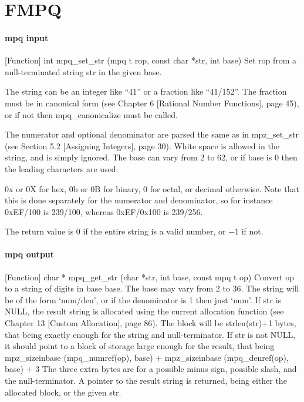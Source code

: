 \chapter{FMPQ}
\lipsum[1]



\subsubsection{mpq input}
[Function] int mpq\_set\_str (mpq t rop, const char *str, int base)
Set rop from a null-terminated string str in the given base.

The string can be an integer like “41” or a fraction like “41/152”. The fraction must be
in canonical form (see Chapter 6 [Rational Number Functions], page 45), or if not then
mpq\_canonicalize must be called.

The numerator and optional denominator are parsed the same as in mpz\_set\_str (see
Section 5.2 [Assigning Integers], page 30). White space is allowed in the string, and is simply
ignored. The base can vary from 2 to 62, or if base is 0 then the leading characters are used:

0x or 0X for hex, 0b or 0B for binary, 0 for octal, or decimal otherwise. Note that this is done
separately for the numerator and denominator, so for instance 0xEF/100 is 239/100, whereas
0xEF/0x100 is 239/256.

The return value is 0 if the entire string is a valid number, or −1 if not.



\subsubsection{mpq output}

[Function] char * mpq\_get\_str (char *str, int base, const mpq t op)
Convert op to a string of digits in base base. The base may vary from 2 to 36. The string
will be of the form ‘num/den’, or if the denominator is 1 then just ‘num’.
If str is NULL, the result string is allocated using the current allocation function (see
Chapter 13 [Custom Allocation], page 86). The block will be strlen(str)+1 bytes, that
being exactly enough for the string and null-terminator.
If str is not NULL, it should point to a block of storage large enough for the result, that being
mpz\_sizeinbase (mpq\_numref(op), base)
+ mpz\_sizeinbase (mpq\_denref(op), base) + 3
The three extra bytes are for a possible minus sign, possible slash, and the null-terminator.
A pointer to the result string is returned, being either the allocated block, or the given str.



